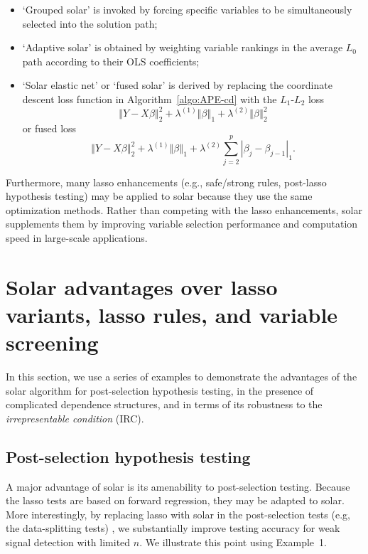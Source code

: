\documentclass[11pt,review,authoryear]{elsarticle}
\begin{document}
\begin{itemize}
  \item `Grouped solar' is invoked by forcing specific variables to be simultaneously selected into the solution path;
  \item `Adaptive solar' is obtained by weighting variable rankings in the average $L_0$ path according to their OLS coefficients;
  \item `Solar elastic net' or `fused solar' is derived by replacing the coordinate descent loss function in Algorithm~\ref{algo:APE-cd} with the $L_1$-$L_2$ loss
    \begin{equation}
      \left\Vert Y -X\beta \right\Vert_2^2 + \lambda^{(1)} \left\Vert \beta \right\Vert_1 + \lambda^{(2)} \left\Vert \beta \right\Vert_2^2
    \end{equation}
    or fused loss
    \begin{equation}
      \left\Vert Y -X\beta \right\Vert_2^2 + \lambda^{(1)} \left\Vert \beta \right\Vert_1 + \lambda^{(2)} \sum_{j=2}^{p} \left\vert \beta_j - \beta_{j-1} \right\vert_1.
    \end{equation}
\end{itemize}

Furthermore, many lasso enhancements (e.g., safe/strong rules, post-lasso hypothesis testing) may be applied to solar because they use the same optimization methods. Rather than competing with the lasso enhancements, solar supplements them by improving variable selection performance and computation speed in large-scale applications.

\section{Solar advantages over lasso variants, lasso rules, and variable screening \label{section:adv}}

In this section, we use a series of examples to demonstrate the advantages of the solar algorithm for post-selection hypothesis testing, in the presence of complicated dependence structures, and in terms of its robustness to the \emph{irrepresentable condition} (IRC).

\subsection{Post-selection hypothesis testing}

A major advantage of solar is its amenability to post-selection testing. Because the lasso tests \citep{lockhartall14, taylor2014exact} are based on forward regression, they may be adapted to solar. More interestingly, by replacing lasso with solar in the post-selection tests (e.g, the data-splitting tests) \citep{wasserman2009high,meinshausen2009p}, we substantially improve testing accuracy for weak signal detection with limited $n$. We illustrate this point using Example~1.
\end{document}
